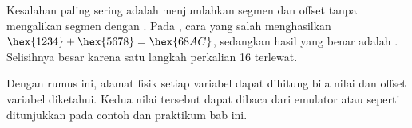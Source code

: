 \begin{peringatanbox}
\vspace{1.1em}
Kesalahan paling sering adalah menjumlahkan segmen dan offset tanpa
mengalikan segmen dengan . Pada , cara
yang salah menghasilkan $\hex{1234} + \hex{5678} = \hex{68AC}$,
sedangkan hasil yang benar adalah . Selisihnya besar
karena satu langkah perkalian 16 terlewat.
\end{peringatanbox}

Dengan rumus ini, alamat fisik setiap variabel dapat dihitung bila
nilai  dan offset variabel diketahui. Kedua nilai tersebut
dapat dibaca dari emulator atau  seperti ditunjukkan
pada contoh dan praktikum bab ini.

